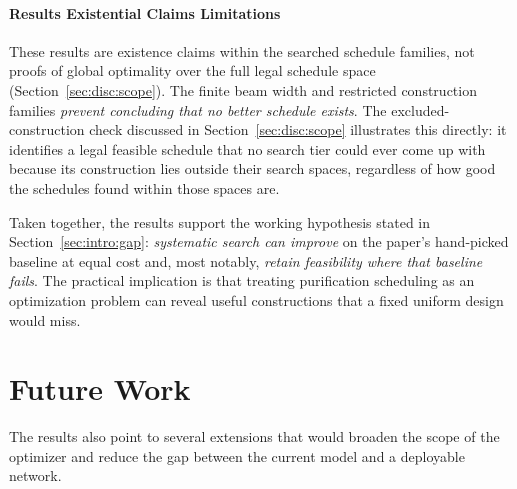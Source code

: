 \vspace{0.7cm}

\paragraph{Results Existential Claims Limitations}

These results are existence claims within the searched schedule families, not proofs of global optimality over the full legal schedule space (Section~\ref{sec:disc:scope}). The finite beam width and restricted construction families \emph{prevent concluding that no better schedule exists}. The excluded-construction check discussed in Section~\ref{sec:disc:scope} illustrates this directly: it identifies a legal feasible schedule that no search tier could ever come up with because its construction lies outside their search spaces, regardless of how good the schedules found within those spaces are.

Taken together, the results support the working hypothesis stated in Section~\ref{sec:intro:gap}: \emph{systematic search can improve} on the paper's hand-picked baseline at equal cost and, most notably, \emph{retain feasibility where that baseline fails}. The practical implication is that treating purification scheduling as an optimization problem can reveal useful constructions that a fixed uniform design would miss.

\section{Future Work}
\label{sec:conc:future}

The results also point to several extensions that would broaden the scope of the optimizer and reduce the gap between the current model and a deployable network.

